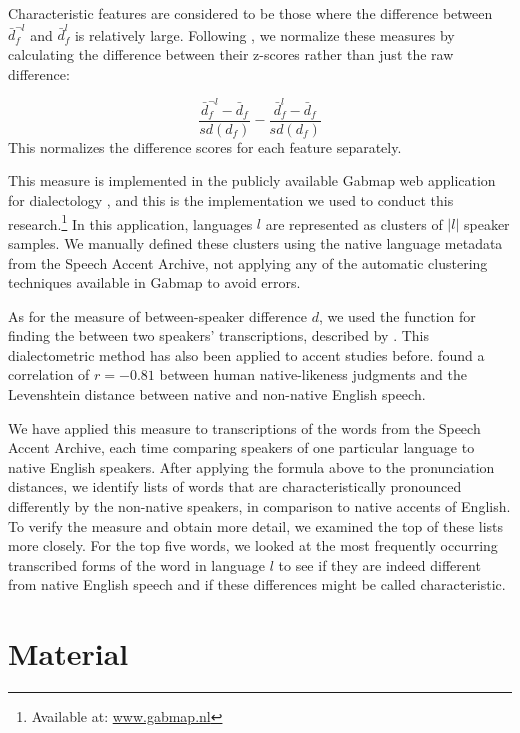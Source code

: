 \documentclass[output=paper]{LSP/langsci}
\begin{document}
Characteristic features are considered to be those where the difference between $\bar{d}^{\neg l}_f$ and $\bar{d}^l_f$ is relatively large. Following \citet{prokic_detecting_2012}, we normalize these measures by calculating the difference between their z-scores rather than just the raw difference:

\begin{equation}
\frac{\bar{d}^{\neg l}_f - \bar{d}_f}{sd(d_f)} - \frac{\bar{d}^{l}_f - \bar{d}_f}{sd(d_f)}
\end{equation}
This normalizes the difference scores for each feature separately.

This measure is implemented in the publicly available Gabmap web application for dialectology \citep{nerbonne_gabmap_2011}, and this is the implementation we used to conduct this research.\footnote{Available at: \url{www.gabmap.nl}} In this application, languages $l$ are represented as clusters of $|l|$ speaker samples. We manually defined these clusters using the native language metadata from the Speech Accent Archive, not applying any of the automatic clustering techniques available in Gabmap to avoid errors.

As for the measure of between-speaker difference $d$, we used the  function for finding the  between two speakers' transcriptions, described by \citet{nerbonne_gabmap_2011}. This dialectometric method has also been applied to accent studies before. \citet{wieling_measuring_2014} found a correlation of $r = -0.81$ between human native-likeness judgments and the Levenshtein distance between native and non-native English speech.   

We have applied this measure to transcriptions of the words from the Speech Accent Archive, each time comparing speakers of one particular language to native English speakers. After applying the formula above to the pronunciation distances, we identify lists of words that are characteristically pronounced differently by the non-native speakers, in comparison to native accents of English. To verify the measure and obtain more detail, we examined the top of these lists more closely. For the top five words, we looked at the most frequently occurring transcribed forms of the word in language $l$ to see if they are indeed different from native English speech and if these differences might be called characteristic.

\section{Material}
\label{s:material}
\end{document}
